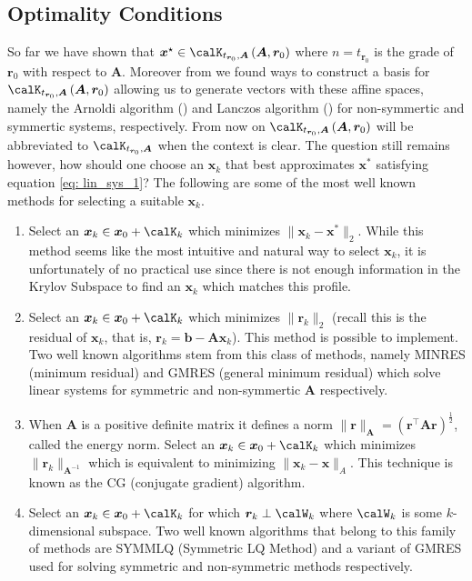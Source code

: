 \subsection{Optimality Conditions}\label{Section4.4}

So far we have shown that $\bm{x}^{\star} \in \calK_{t_{\bm{r}_0}, \bm{A}} \left( \bm{A}, \bm{r}_0 \right)$ where $n = t_{\bm{r}_0}$ is the grade of $\bm{r}_0$ with respect to $\bm{A}$. Moreover from  we found ways to construct a basis for $\calK_{t_{\bm{r}_0}, \bm{A}} \left( \bm{A}, \bm{r}_0 \right)$ allowing us to generate vectors with these affine spaces, namely the Arnoldi algorithm () and Lanczos algorithm () for non-symmertic and symmertic systems, respectively. From now on $\calK_{t_{\bm{r}_0}, \bm{A}} \left( \bm{A}, \bm{r}_0 \right)$ will be abbreviated to $\calK_{t_{\bm{r}_0}, \bm{A}}$ when the context is clear. The question still remains however, how should one choose an $\bm{x}_k$ that best approximates $\bm{x}^{\ast}$ satisfying equation \ref{eq: lin_sys_1}? The following are some of the most well known methods for selecting a suitable $\bm{x}_k$.

\begin{enumerate}

    \item Select an $\bm{x}_k \in \bm{x}_0 + \calK_k$ which minimizes $\| \bm{x}_k - \bm{x}^{\ast} \|_2$. While this method seems like the most intuitive and natural way to select $\bm{x}_k$, it is unfortunately of no practical use since there is not enough information in the Krylov Subspace to find an $\bm{x}_k$ which matches this profile.

    \item Select an $\bm{x}_k \in \bm{x}_0 + \calK_k$ which minimizes $\| \bm{r}_k \|_2$ (recall this is the residual of $\bm{x}_k$, that is, $\bm{r}_k = \bm{b} - \bm{A} \bm{x}_k$). This method is possible to implement. Two well known algorithms stem from this class of methods, namely MINRES (minimum residual) and GMRES (general minimum residual) which solve linear systems for symmetric and non-symmertic $\bm{A}$ respectively.

    \item When $\bm{A}$ is a positive definite matrix it defines a norm $\| \bm{r} \|_{\bm{A}} = \left( \bm{r}^{\intercal} \bm{A} \bm{r} \right)^{\frac{1}{2}}$, called the energy norm. Select an $\bm{x}_k \in \bm{x}_0 + \calK_k$ which minimizes $\| \bm{r}_{k} \|_{\bm{A}^{-1}}$ which is equivalent to minimizing $\| \bm{x}_k - \bm{x} \|_{A}$. This technique is known as the CG (conjugate gradient) algorithm.

    \item Select an $\bm{x}_k \in \bm{x}_0 + \calK_k$ for which $\bm{r}_{k} \perp \calW_k$ where $\calW_k$ is some $k$-dimensional subspace. Two well known algorithms that belong to this family of methods are SYMMLQ (Symmetric LQ Method) and a variant of GMRES used for solving symmetric and non-symmetric methods respectively.

\end{enumerate}

